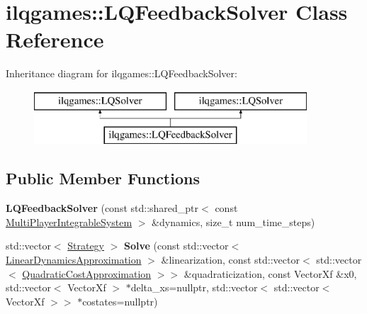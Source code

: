 \hypertarget{classilqgames_1_1_l_q_feedback_solver}{}\section{ilqgames\+:\+:L\+Q\+Feedback\+Solver Class Reference}
\label{classilqgames_1_1_l_q_feedback_solver}
Inheritance diagram for ilqgames\+:\+:L\+Q\+Feedback\+Solver\+:\begin{figure}[H]
\begin{center}
\leavevmode
\includegraphics[height=2.000000cm]{classilqgames_1_1_l_q_feedback_solver}
\end{center}
\end{figure}
\subsection*{Public Member Functions}
\begin{DoxyCompactItemize}
\item 
{\bfseries L\+Q\+Feedback\+Solver} (const std\+::shared\+\_\+ptr$<$ const \hyperlink{classilqgames_1_1_multi_player_integrable_system}{Multi\+Player\+Integrable\+System} $>$ \&dynamics, size\+\_\+t num\+\_\+time\+\_\+steps)\hypertarget{classilqgames_1_1_l_q_feedback_solver_ac320229137060866f2020773657995ba}{}\label{classilqgames_1_1_l_q_feedback_solver_ac320229137060866f2020773657995ba}

\item 
std\+::vector$<$ \hyperlink{structilqgames_1_1_strategy}{Strategy} $>$ {\bfseries Solve} (const std\+::vector$<$ \hyperlink{structilqgames_1_1_linear_dynamics_approximation}{Linear\+Dynamics\+Approximation} $>$ \&linearization, const std\+::vector$<$ std\+::vector$<$ \hyperlink{structilqgames_1_1_quadratic_cost_approximation}{Quadratic\+Cost\+Approximation} $>$$>$ \&quadraticization, const Vector\+Xf \&x0, std\+::vector$<$ Vector\+Xf $>$ $\ast$delta\+\_\+xs=nullptr, std\+::vector$<$ std\+::vector$<$ Vector\+Xf $>$$>$ $\ast$costates=nullptr)\hypertarget{classilqgames_1_1_l_q_feedback_solver_ac48899856e1783291989e2c92d30ed36}{}\label{classilqgames_1_1_l_q_feedback_solver_ac48899856e1783291989e2c92d30ed36}

\end{DoxyCompactItemize}


